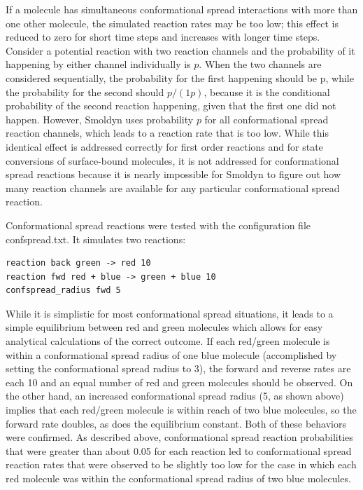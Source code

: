 \documentclass {book}
\begin{document}
If a molecule has simultaneous conformational spread interactions with more than one other molecule, the simulated reaction rates may be too low; this effect is reduced to zero for short time steps and increases with longer time steps. Consider a potential reaction with two reaction channels and the probability of it happening by either channel individually is $p$. When the two channels are considered sequentially, the probability for the first happening should be p, while the probability for the second should $p/(1p)$, because it is the conditional probability of the second reaction happening, given that the first one did not happen. However, Smoldyn uses probability $p$ for all conformational spread reaction channels, which leads to a reaction rate that is too low. While this identical effect is addressed correctly for first order reactions and for state conversions of surface-bound molecules, it is not addressed for conformational spread reactions because it is nearly impossible for Smoldyn to figure out how many reaction channels are available for any particular conformational spread reaction.

Conformational spread reactions were tested with the configuration file confspread.txt. It simulates two reactions:
\begin{lstlisting}[style=SSAC]
reaction back green -> red 10
reaction fwd red + blue -> green + blue 10
confspread_radius fwd 5
\end{lstlisting}
While it is simplistic for most conformational spread situations, it leads to a simple equilibrium between red and green molecules which allows for easy analytical calculations of the correct outcome. If each red/green molecule is within a conformational spread radius of one blue molecule (accomplished by setting the conformational spread radius to 3), the forward and reverse rates are each 10 and an equal number of red and green molecules should be observed. On the other hand, an increased conformational spread radius (5, as shown above) implies that each red/green molecule is within reach of two blue molecules, so the forward rate doubles, as does the equilibrium constant. Both of these behaviors were confirmed. As described above, conformational spread reaction probabilities that were greater than about 0.05 for each reaction led to conformational spread reaction rates that were observed to be slightly too low for the case in which each red molecule was within the conformational spread radius of two blue molecules.
\end{document}

